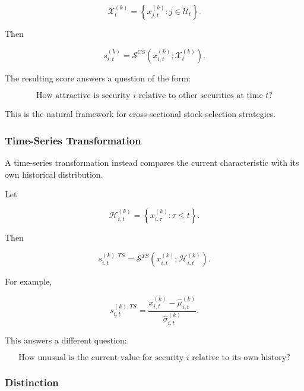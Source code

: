 \documentclass[11pt,a4paper]{article}
\begin{document}
\begin{equation}
\mathcal{X}_t^{(k)}
=
\left\{
x_{j,t}^{(k)}
:
j\in\mathcal{U}_t
\right\}.
\end{equation}

Then

\begin{equation}
\boxed{
s_{i,t}^{(k)}
=
\mathcal{S}^{CS}
\left(
x_{i,t}^{(k)};
\mathcal{X}_t^{(k)}
\right).
}
\end{equation}

The resulting score answers a question of the form:

\begin{equation}
\boxed{
\text{How attractive is security }i
\text{ relative to other securities at time }t?
}
\end{equation}

This is the natural framework for cross-sectional stock-selection strategies.


\subsubsection{Time-Series Transformation}

A time-series transformation instead compares the current characteristic with
its own historical distribution.

Let

\begin{equation}
\mathcal{H}_{i,t}^{(k)}
=
\left\{
x_{i,\tau}^{(k)}
:
\tau\leq t
\right\}.
\end{equation}

Then

\begin{equation}
\boxed{
s_{i,t}^{(k),TS}
=
\mathcal{S}^{TS}
\left(
x_{i,t}^{(k)};
\mathcal{H}_{i,t}^{(k)}
\right).
}
\end{equation}

For example,

\begin{equation}
s_{i,t}^{(k),TS}
=
\frac{
x_{i,t}^{(k)}
-
\widehat{\mu}_{i,t}^{(k)}
}{
\widehat{\sigma}_{i,t}^{(k)}
}.
\end{equation}

This answers a different question:

\begin{equation}
\boxed{
\text{How unusual is the current value for security }i
\text{ relative to its own history?}
}
\end{equation}


\subsubsection{Distinction}
\end{document}
